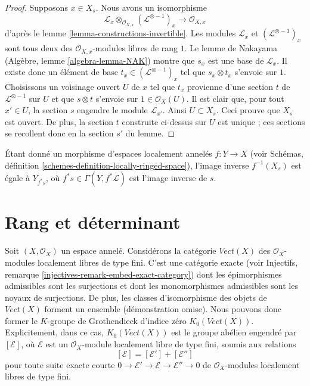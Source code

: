 \begin{proof}
Supposons $x \in X_s$.
Nous avons un isomorphisme
$$
\mathcal{L}_x \otimes_{\mathcal{O}_{X, x}} (\mathcal{L}^{\otimes -1})_x
\longrightarrow
\mathcal{O}_{X, x}
$$
d'après le lemme \ref{lemma-constructions-invertible}.
Les modules $\mathcal{L}_x$ et $(\mathcal{L}^{\otimes -1})_x$
sont tous deux des $\mathcal{O}_{X, x}$-modules libres de rang $1$. Le
lemme de Nakayama (Algèbre, lemme \ref{algebra-lemma-NAK}) montre que
$s_x$ est une base de $\mathcal{L}_x$. Il existe donc
un élément de base $t_x \in (\mathcal{L}^{\otimes -1})_x$
tel que $s_x \otimes t_x$ s'envoie sur $1$.
Choisissons un voisinage ouvert $U$ de
$x$ tel que $t_x$ provienne d'une section $t$
de $\mathcal{L}^{\otimes -1}$ sur $U$ et que
$s \otimes t$ s'envoie sur $1 \in \mathcal{O}_X(U)$.
Il est clair que, pour tout $x' \in U$, la section $s$ engendre
le module $\mathcal{L}_{x'}$. Ainsi $U \subset X_s$.
Ceci prouve que $X_s$ est ouvert. De plus, la section
$t$ construite ci-dessus sur $U$ est unique ; ces sections
se recollent donc en la section $s'$ du lemme.
\end{proof}

\begin{remark}
\label{remark-pullback-s-open}
Étant donné un morphisme d'espaces localement annelés $f : Y \to X$
(voir Schémas, définition \ref{schemes-definition-locally-ringed-space}),
l'image inverse $f^{-1}(X_s)$ est égale à $Y_{f^*s}$, où
$f^*s \in \Gamma(Y, f^*\mathcal{L})$ est l'image inverse de $s$.
\end{remark}


\section{Rang et déterminant}
\label{section-rank-and-det}

\noindent
Soit $(X, \mathcal{O}_X)$ un espace annelé. Considérons la catégorie
$\textit{Vect}(X)$ des $\mathcal{O}_X$-modules localement libres de type fini.
C'est une catégorie exacte
(voir Injectifs, remarque \ref{injectives-remark-embed-exact-category})
dont les épimorphismes admissibles sont les
surjections et dont les monomorphismes admissibles sont les noyaux de
surjections. De plus, les classes d'isomorphisme des objets de
$\textit{Vect}(X)$ forment un ensemble (démonstration omise). Nous pouvons donc former
le $K$-groupe de Grothendieck d'indice zéro $K_0(\textit{Vect}(X))$.
Explicitement, dans ce cas, $K_0(\textit{Vect}(X))$
est le groupe abélien engendré par $[\mathcal{E}]$, où $\mathcal{E}$
est un $\mathcal{O}_X$-module localement libre de type fini, soumis aux relations
$$
[\mathcal{E}] = [\mathcal{E}'] + [\mathcal{E}'']
$$
pour toute suite exacte courte
$0 \to \mathcal{E}' \to \mathcal{E} \to \mathcal{E}'' \to 0$
de $\mathcal{O}_X$-modules localement libres de type fini.

